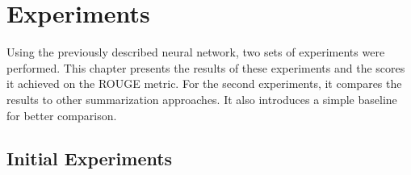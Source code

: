 \chapter{Experiments}\label{ch:experiments}

Using the previously described neural network, two sets of experiments were performed.
This chapter presents the results of these experiments and the scores it achieved on the ROUGE metric.
For the second experiments, it compares the results to other summarization approaches.
It also introduces a simple baseline for better comparison.


\section{Initial Experiments}\label{sec:initial-experiments}

